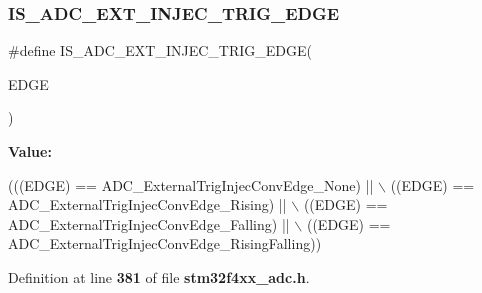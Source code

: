 \subsubsection{I\+S\+\_\+\+A\+D\+C\+\_\+\+E\+X\+T\+\_\+\+I\+N\+J\+E\+C\+\_\+\+T\+R\+I\+G\+\_\+\+E\+D\+GE}
{\footnotesize\ttfamily \#define I\+S\+\_\+\+A\+D\+C\+\_\+\+E\+X\+T\+\_\+\+I\+N\+J\+E\+C\+\_\+\+T\+R\+I\+G\+\_\+\+E\+D\+GE(\begin{DoxyParamCaption}\item[{}]{E\+D\+GE }\end{DoxyParamCaption})}

{\bfseries Value\+:}
\begin{DoxyCode}
(((EDGE) == ADC_ExternalTrigInjecConvEdge_None) || \(\backslash\)
                                          ((EDGE) == 
      ADC_ExternalTrigInjecConvEdge_Rising) || \(\backslash\)
                                          ((EDGE) == 
      ADC_ExternalTrigInjecConvEdge_Falling) || \(\backslash\)
                                          ((EDGE) == 
      ADC_ExternalTrigInjecConvEdge_RisingFalling))
\end{DoxyCode}


Definition at line \textbf{ 381} of file \textbf{ stm32f4xx\+\_\+adc.\+h}.

